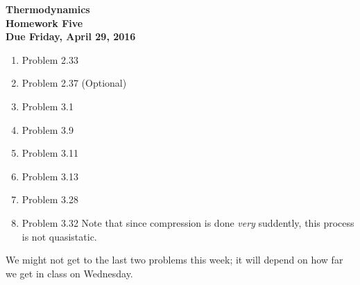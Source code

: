 \documentclass[12pt]{article}
\begin{document}
\pagestyle{empty}
 
\begin{center}
{\large {\bf Thermodynamics}}\\
\medskip
{\large {\bf Homework Five}}\\
\medskip
{ {\bf Due Friday, April 29, 2016}}\\
\end{center}


\begin{enumerate}
  \item Problem 2.33
  \item Problem 2.37 (Optional)
  \item Problem 3.1
  \item Problem 3.9
  \item Problem 3.11
  \item Problem 3.13
  \item Problem 3.28
  \item Problem 3.32  Note that since compression is done \emph{very}
    suddently, this process is not quasistatic.
\end{enumerate}

\noindent We might not get to the last two problems this week; it will
depend on how far we get in class on Wednesday. 
\end{document}
